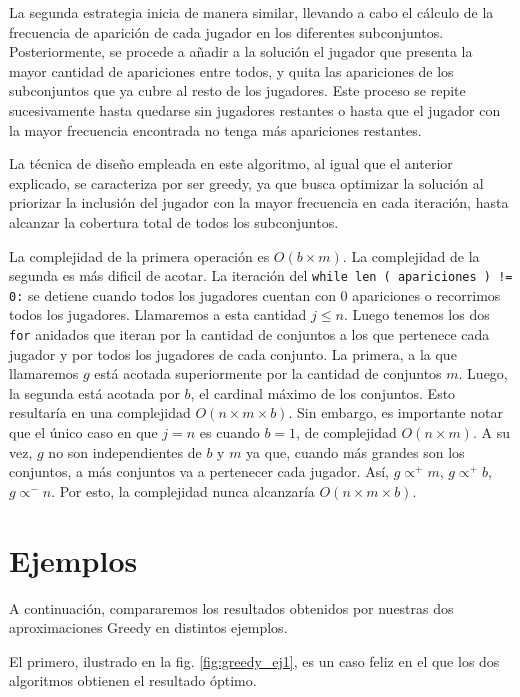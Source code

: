 La segunda estrategia inicia de manera similar, llevando a cabo el cálculo de la frecuencia de aparición de cada jugador en los diferentes subconjuntos. Posteriormente, se procede a añadir a la solución el jugador que presenta la mayor cantidad de apariciones entre todos, y quita las apariciones de los subconjuntos que ya cubre al resto de los jugadores. Este proceso se repite sucesivamente hasta quedarse sin jugadores restantes o hasta que el jugador con la mayor frecuencia encontrada no tenga más apariciones restantes.

La técnica de diseño empleada en este algoritmo, al igual que el anterior explicado, se caracteriza por ser greedy, ya que busca optimizar la solución al priorizar la inclusión del jugador con la mayor frecuencia en cada iteración, hasta alcanzar la cobertura total de todos los subconjuntos. 



La complejidad de la primera operación es $O(b \times m)$. La complejidad de la segunda es más dificil de acotar. La iteración del \texttt{while len ( apariciones ) != 0:} se detiene cuando todos los jugadores cuentan con $0$ apariciones o recorrimos todos los jugadores. Llamaremos a esta cantidad $j \leq n$. Luego tenemos los dos \texttt{for} anidados que iteran por la cantidad de conjuntos a los que pertenece cada jugador y por todos los jugadores de cada conjunto. La primera, a la que llamaremos $g$ está acotada superiormente por la cantidad de conjuntos $m$. Luego, la segunda está acotada por $b$, el cardinal máximo de los conjuntos. Esto resultaría en una complejidad $O(n\times m\times b)$. Sin embargo, es importante notar que el único caso en que $j=n$ es cuando $b=1$, de complejidad $O(n\times m)$. A su vez, $g$ no son independientes de $b$ y $m$ ya que, cuando más grandes son los conjuntos, a más conjuntos va a pertenecer cada jugador. Así, $g \propto^{+} m$, $g \propto^{+} b$, $g \propto^{-} n$. Por esto, la complejidad nunca alcanzaría $O(n\times m\times b)$.

\section{Ejemplos}

A continuación, compararemos los resultados obtenidos por nuestras dos aproximaciones Greedy en distintos ejemplos.

El primero, ilustrado en la fig. \ref{fig:greedy_ej1}, es un caso feliz en el que los dos algoritmos obtienen el resultado óptimo.

